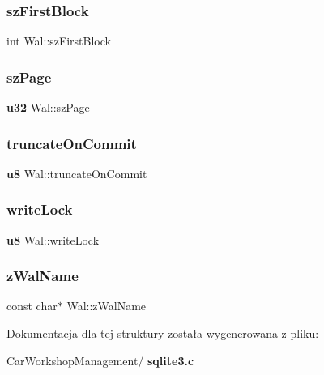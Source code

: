 \mbox{\label{struct_wal_a901c02626270f4d51db89786e4994da9}} 
\subsubsection{szFirstBlock}
{\footnotesize\ttfamily int Wal\+::sz\+First\+Block}

\mbox{\label{struct_wal_a771c3a8c81326babc7d623255a6034c5}} 
\subsubsection{szPage}
{\footnotesize\ttfamily \textbf{ u32} Wal\+::sz\+Page}

\mbox{\label{struct_wal_a12870bbe7755271c94c3eb1fd0280c56}} 
\subsubsection{truncateOnCommit}
{\footnotesize\ttfamily \textbf{ u8} Wal\+::truncate\+On\+Commit}

\mbox{\label{struct_wal_ad7f4ba84f07115b7ce3a6133479c9d24}} 
\subsubsection{writeLock}
{\footnotesize\ttfamily \textbf{ u8} Wal\+::write\+Lock}

\mbox{\label{struct_wal_ac54961758701702d67eaf3ce15c69ea5}} 
\subsubsection{zWalName}
{\footnotesize\ttfamily const char$\ast$ Wal\+::z\+Wal\+Name}



Dokumentacja dla tej struktury została wygenerowana z pliku\+:\begin{DoxyCompactItemize}
\item 
Car\+Workshop\+Management/\textbf{ sqlite3.\+c}\end{DoxyCompactItemize}
